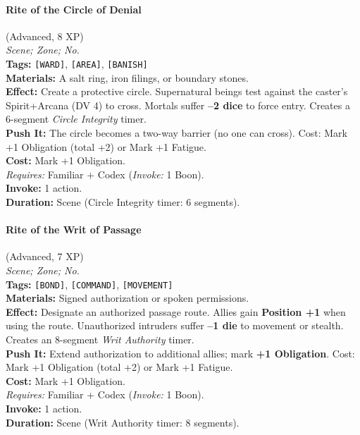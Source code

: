 \paragraph{Rite of the Circle of Denial} (Advanced, 8 XP) \hfill \\
\emph{Scene; Zone; No.} \\
\textbf{Tags:} \texttt{[WARD]}, \texttt{[AREA]}, \texttt{[BANISH]} \\
\textbf{Materials:} A salt ring, iron filings, or boundary stones. \\
\textbf{Effect:} Create a protective circle. Supernatural beings test against the caster's Spirit+Arcana (DV 4) to cross. Mortals suffer \textbf{--2 dice} to force entry. Creates a 6-segment \textit{Circle Integrity} timer. \\
\textbf{Push It:} The circle becomes a two-way barrier (no one can cross). Cost: Mark +1 Obligation (total +2) or Mark +1 Fatigue. \\
\textbf{Cost:} Mark +1 Obligation. \\
\textit{Requires:} Familiar + Codex (\textit{Invoke:} 1 Boon). \\
\textbf{Invoke:} 1 action. \\
\textbf{Duration:} Scene (Circle Integrity timer: 6 segments).

\paragraph{Rite of the Writ of Passage} (Advanced, 7 XP) \hfill \\
\emph{Scene; Zone; No.} \\
\textbf{Tags:} \texttt{[BOND]}, \texttt{[COMMAND]}, \texttt{[MOVEMENT]} \\
\textbf{Materials:} Signed authorization or spoken permissions. \\
\textbf{Effect:} Designate an authorized passage route. Allies gain \textbf{Position +1} when using the route. Unauthorized intruders suffer \textbf{--1 die} to movement or stealth. Creates an 8-segment \textit{Writ Authority} timer. \\
\textbf{Push It:} Extend authorization to additional allies; mark \textbf{+1 Obligation}. Cost: Mark +1 Obligation (total +2) or Mark +1 Fatigue. \\
\textbf{Cost:} Mark +1 Obligation. \\
\textit{Requires:} Familiar + Codex (\textit{Invoke:} 1 Boon). \\
\textbf{Invoke:} 1 action. \\
\textbf{Duration:} Scene (Writ Authority timer: 8 segments).

